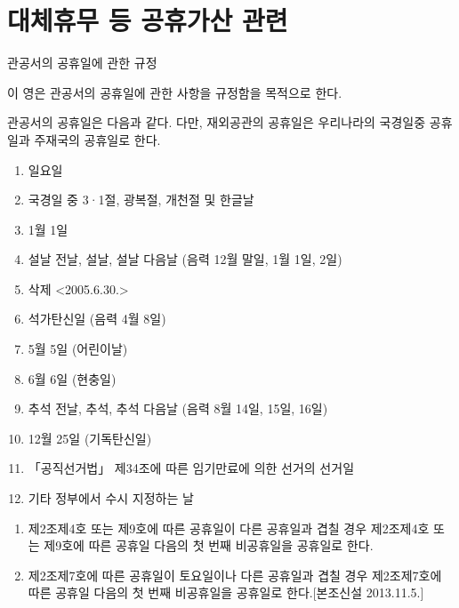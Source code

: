 ﻿\section{대체휴무 등 공휴가산 관련}

\begin{commentbox}{관공서의 공휴일에 관한 규정}
\begin{description}\tightlist
\item[제1조(목적)] 이 영은 관공서의 공휴일에 관한 사항을 규정함을 목적으로 한다.
\item[제2조(공휴일)] 관공서의 공휴일은 다음과 같다. 다만, 재외공관의 공휴일은 우리나라의 국경일중 공휴일과 주재국의 공휴일로 한다.
	\begin{enumerate}[1.]\tightlist
	\item 일요일
	\item 국경일 중 3·1절, 광복절, 개천절 및 한글날
	\item 1월 1일
	\item 설날 전날, 설날, 설날 다음날 (음력 12월 말일, 1월 1일, 2일)
	\item 삭제 <2005.6.30.>
	\item 석가탄신일 (음력 4월 8일)
	\item 5월 5일 (어린이날)
	\item 6월 6일 (현충일)
	\item 추석 전날, 추석, 추석 다음날 (음력 8월 14일, 15일, 16일)
	\item 12월 25일 (기독탄신일)
	\item 「공직선거법」 제34조에 따른 임기만료에 의한 선거의 선거일
	\item 기타 정부에서 수시 지정하는 날
	\end{enumerate}
\item[제3조(대체공휴일)]
	\begin{enumerate}[①]\tightlist
	\item 제2조제4호 또는 제9호에 따른 공휴일이 다른 공휴일과 겹칠 경우 제2조제4호 또는 제9호에 따른 공휴일 다음의 첫 번째 비공휴일을 공휴일로 한다.
	\item 제2조제7호에 따른 공휴일이 토요일이나 다른 공휴일과 겹칠 경우 제2조제7호에 따른 공휴일 다음의 첫 번째 비공휴일을 공휴일로 한다.[본조신설 2013.11.5.]
	\end{enumerate}
\end{description}	
\end{commentbox}
